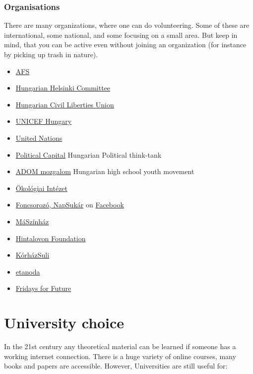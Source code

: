 \documentclass{article}
\begin{document}
\subsubsection{Organisations}
There are many organizations, where one can do volunteering. Some of these are international, some national, and some focusing on a small area.
But keep in mind, that you can be active even without joining an organization (for instance by picking up trash in nature).
\begin{itemize}
    \item \href{https://afs.org/}{AFS}
    \item \href{https://helsinki.hu/en/support/apply-to-volunteer/}{Hungarian Helsinki Committee}
    \item \href{https://hclu.hu/en/about-us}{Hungarian Civil Liberties Union}
    \item \href{https://unicef.hu/igy-segithetsz/onkentes}{UNICEF Hungary}
    \item \href{https://www.unv.org/}{United Nations}
    \item \href{https://www.politicalcapital.hu/}{Political Capital} Hungarian Political think-tank
    \item \href{https://adommozgalom.hu/}{ADOM mozgalom} Hungarian high school youth movement
    \item \href{https://www.ecolinst.hu/index.php}{Ökológiai Intézet}
    \item \href{https://web.archive.org/web/20171124170411/http://foncsorozo.hu/napsukar/}{Foncsorozó, NapSukár} on \href{https://www.facebook.com/napsukar/}{Facebook}
    \item \href{https://mas-zinhaz.hu/}{MáSzínház}
    \item \href{https://hintalovon.hu/en/child-participation-policy/}{Hintalovon Foundation}
    \item \href{https://korhazsuli.hu/onkenteseknek/}{KórházSuli}
    \item \href{http://www.etanoda.hu/segits_oktatassal_gyere_hozzank_mentornak_207}{etanoda}
    \item \href{https://fridaysforfuture.org/}{Fridays for Future}
\end{itemize}

\section{University choice}

In the 21st century any theoretical material can be learned if someone has a working internet connection. There is a huge variety of online courses, many books and papers are accessible. However, Universities are still useful for:
\end{document}
